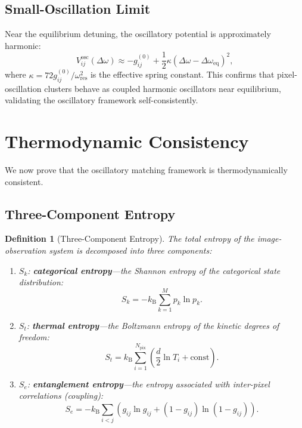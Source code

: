 \documentclass[11pt,twocolumn,a4paper]{article}
\newtheorem{definition}[theorem]{Definition}
\newcommand{\kb}{k_{\mathrm{B}}}
\newcommand{\Sk}{S_k}
\newcommand{\St}{S_t}
\newcommand{\Se}{S_e}
\begin{document}
\subsection{Small-Oscillation Limit}

Near the equilibrium detuning, the oscillatory potential is approximately harmonic:
\begin{equation}
    V_{ij}^{\text{osc}}(\Delta\omega) \approx -g_{ij}^{(0)} + \frac{1}{2} \kappa (\Delta\omega - \Delta\omega_{\text{eq}})^2,
    \label{eq:harmonic_approx}
\end{equation}
where $\kappa = 72 g_{ij}^{(0)} / \omega_{\text{res}}^2$ is the effective spring constant. This confirms that pixel-oscillation clusters behave as coupled harmonic oscillators near equilibrium, validating the oscillatory framework self-consistently.

\section{Thermodynamic Consistency}\label{sec:thermodynamic_consistency}

We now prove that the oscillatory matching framework is thermodynamically consistent.

\subsection{Three-Component Entropy}

\begin{definition}[Three-Component Entropy]\label{def:three_entropy}
The total entropy of the image-observation system is decomposed into three components:
\begin{enumerate}[label=(\roman*)]
    \item $\Sk$: \textbf{categorical entropy}---the Shannon entropy of the categorical state distribution:
    \begin{equation}
        \Sk = -\kb \sum_{k=1}^{M} p_k \ln p_k.
        \label{eq:S_k}
    \end{equation}
    \item $\St$: \textbf{thermal entropy}---the Boltzmann entropy of the kinetic degrees of freedom:
    \begin{equation}
        \St = \kb \sum_{i=1}^{N_{\text{pix}}} \left( \frac{d}{2} \ln T_i + \text{const} \right).
        \label{eq:S_t}
    \end{equation}
    \item $\Se$: \textbf{entanglement entropy}---the entropy associated with inter-pixel correlations (coupling):
    \begin{equation}
        \Se = -\kb \sum_{i < j} \left( g_{ij} \ln g_{ij} + (1 - g_{ij}) \ln(1 - g_{ij}) \right).
        \label{eq:S_e}
    \end{equation}
\end{enumerate}
\end{definition}
\end{document}
